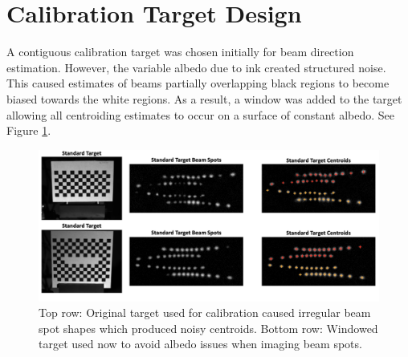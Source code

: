 \section{Calibration Target Design}
A contiguous calibration target was chosen initially for beam direction estimation. However, the variable albedo due to ink created structured noise. This caused estimates of beams partially overlapping black regions to become biased towards the white regions. As a result, a window was added to the target allowing all centroiding estimates to occur on a surface of constant albedo. See Figure \ref{fig:target_window}.

\begin{figure}
    \centering
    \includegraphics[width=\linewidth]{figures/CalTarget_Std_vs_Windowed.png}
    \caption{Top row: Original target used for calibration caused irregular beam spot shapes which produced noisy centroids. Bottom row: Windowed target used now to avoid albedo issues when imaging beam spots.}
    \label{fig:target_window}
\end{figure}